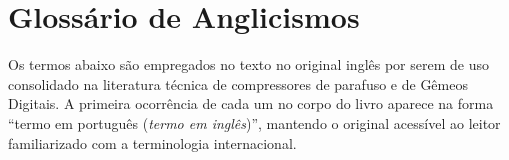 \documentclass[12pt,a4paper]{article}
\numberwithin{equation}{section}
\numberwithin{table}{section}
\numberwithin{figure}{section}
\begin{document}
\clearpage
{}
{}
\listoffigures

\clearpage
{}
{}
\listoftables



\clearpage
\section*{Glossário de Anglicismos}

Os termos abaixo são empregados no texto no original inglês por serem de uso consolidado na literatura técnica de compressores de parafuso e de Gêmeos Digitais. A primeira ocorrência de cada um no corpo do livro aparece na forma ``termo em português (\textit{termo em inglês})'', mantendo o original acessível ao leitor familiarizado com a terminologia internacional.
\end{document}
